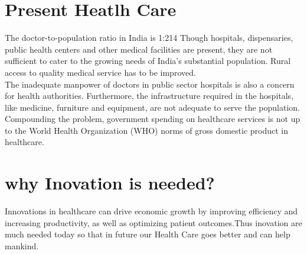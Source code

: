 \documentclass[12pt]{report}
\begin{document}
\section{Present Heatlh Care}
The doctor-to-population ratio in India is 1:214 Though hospitals, dispensaries, public health centers and other medical facilities are present, they are not sufficient to cater to the growing needs of India's substantial population. Rural access to quality medical service has to be improved.\\
The inadequate manpower of doctors in public sector hospitals is also a concern for health authorities. Furthermore, the infrastructure required in the hospitals, like medicine, furniture and equipment, are not adequate to serve the population. Compounding the problem, government spending on healthcare services is not up to the World Health Organization (WHO) norms of gross domestic product in healthcare.\\

\section{why Inovation is needed?}

Innovations in healthcare can drive economic growth by improving efficiency and increasing productivity, as well as optimizing patient outcomes.Thus inovation are much needed today so that in future our Health Care goes better and can help mankind.

\clearpage
\end{document}
